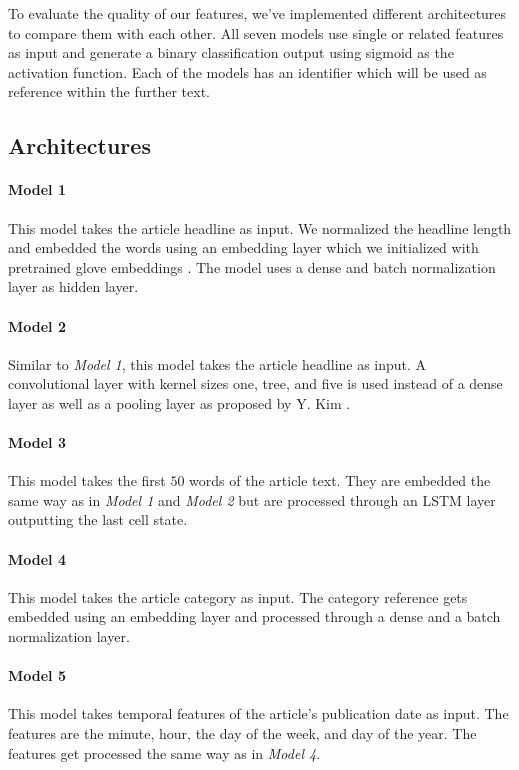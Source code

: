 To evaluate the quality of our features, we've implemented different architectures to compare them with each other.
All seven models use single or related features as input and generate a binary classification output using sigmoid as the activation function. Each of the models has an identifier which will be used as reference within the further text.

\subsection{Architectures}

\paragraph{Model 1} 
This model takes the article headline as input. We normalized the headline length and embedded the words using an embedding layer which we initialized with pretrained glove embeddings \cite{pennington2014glove}. The model uses a dense and batch normalization layer as hidden layer.

\paragraph{Model 2} 
Similar to \textit{Model 1}, this model takes the article headline as input. 
A convolutional layer with kernel sizes one, tree, and five is used instead of a dense layer as well as a pooling layer as proposed by Y. Kim \cite{kim2014convolutional}.

\paragraph{Model 3} 
This model takes the first $50$ words of the article text. They are embedded the same way as in \textit{Model 1} and \textit{Model 2} but are processed through an LSTM layer outputting the last cell state.

\paragraph{Model 4} 
This model takes the article category as input. The category reference gets embedded using an embedding layer and processed through a dense and a batch normalization layer.

\paragraph{Model 5} 
This model takes temporal features of the article's publication date as input. The features are the minute, hour, the day of the week, and day of the year. The features get processed the same way as in \textit{Model 4}.

